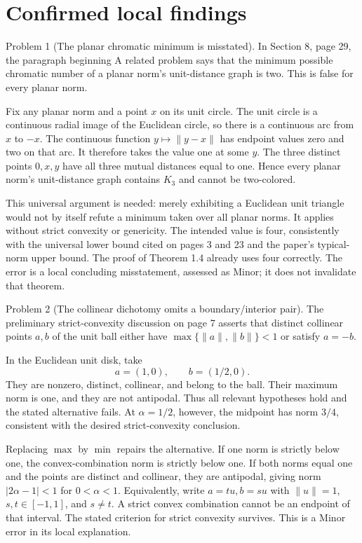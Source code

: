\documentclass[10pt]{article}
\begin{document}
\section*{Confirmed local findings}
Problem 1 (The planar chromatic minimum is misstated).  In Section 8, page 29, the paragraph beginning A related problem says that the minimum possible chromatic number of a planar norm’s unit-distance graph is two. This is false for every planar norm.\par
Fix any planar norm and a point \(x\) on its unit circle. The unit circle is a continuous radial image of the Euclidean circle, so there is a continuous arc from \(x\) to \(-x\). The continuous function \(y\mapsto\|y-x\|\) has endpoint values zero and two on that arc. It therefore takes the value one at some \(y\). The three distinct points \(0,x,y\) have all three mutual distances equal to one. Hence every planar norm’s unit-distance graph contains \(K_3\) and cannot be two-colored.\par
This universal argument is needed: merely exhibiting a Euclidean unit triangle would not by itself refute a minimum taken over all planar norms. It applies without strict convexity or genericity. The intended value is four, consistently with the universal lower bound cited on pages 3 and 23 and the paper’s typical-norm upper bound. The proof of Theorem 1.4 already uses four correctly. The error is a local concluding misstatement, assessed as Minor; it does not invalidate that theorem.\par
Problem 2 (The collinear dichotomy omits a boundary/interior pair).  The preliminary strict-convexity discussion on page 7 asserts that distinct collinear points \(a,b\) of the unit ball either have \(\max\{\|a\|,\|b\|\}<1\) or satisfy \(a=-b\).\par
In the Euclidean unit disk, take \[a=(1,0),\qquad b=(1/2,0).\] They are nonzero, distinct, collinear, and belong to the ball. Their maximum norm is one, and they are not antipodal. Thus all relevant hypotheses hold and the stated alternative fails. At \(\alpha=1/2\), however, the midpoint has norm \(3/4\), consistent with the desired strict-convexity conclusion.\par
Replacing \(\max\) by \(\min\) repairs the alternative. If one norm is strictly below one, the convex-combination norm is strictly below one. If both norms equal one and the points are distinct and collinear, they are antipodal, giving norm \(|2\alpha-1|<1\) for \(0<\alpha<1\). Equivalently, write \(a=tu,b=su\) with \(\|u\|=1\), \(s,t\in[-1,1]\), and \(s\ne t\). A strict convex combination cannot be an endpoint of that interval. The stated criterion for strict convexity survives. This is a Minor error in its local explanation.\par
\end{document}
